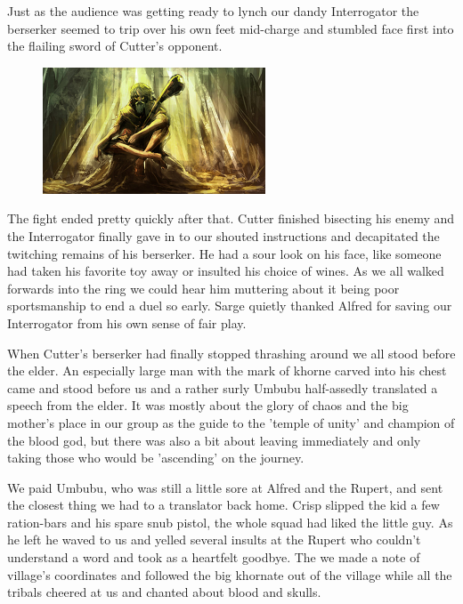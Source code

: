 Just as the audience was getting ready to lynch our dandy Interrogator the berserker seemed to trip over his own feet mid-charge and stumbled face first into the flailing sword of Cutter's opponent.

\begin{figure}
	\begin{center}
		\includegraphics[width=\figwidth]{pics/6/35.png}
	\end{center}
\end{figure}
The fight ended pretty quickly after that. 
Cutter finished bisecting his enemy and the Interrogator finally gave in to our shouted instructions and decapitated the twitching remains of his berserker. 
He had a sour look on his face, like someone had taken his favorite toy away or insulted his choice of wines. 
As we all walked forwards into the ring we could hear him muttering about it being poor sportsmanship to end a duel so early. 
Sarge quietly thanked Alfred for saving our Interrogator from his own sense of fair play.

When Cutter's berserker had finally stopped thrashing around we all stood before the elder. 
An especially large man with the mark of khorne carved into his chest came and stood before us and a rather surly Umbubu half-assedly translated a speech from the elder. 
It was mostly about the glory of chaos and the big mother's place in our group as the guide to the 'temple of unity' and champion of the blood god, but there was also a bit about leaving immediately and only taking those who would be 'ascending' on the journey.

We paid Umbubu, who was still a little sore at Alfred and the Rupert, and sent the closest thing we had to a translator back home. 
Crisp slipped the kid a few ration-bars and his spare snub pistol, the whole squad had liked the little guy. 
As he left he waved to us and yelled several insults at the Rupert who couldn't understand a word and took as a heartfelt goodbye. 
The we made a note of village's coordinates and followed the big khornate out of the village while all the tribals cheered at us and chanted about blood and skulls.

